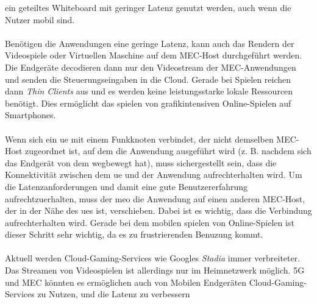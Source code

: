 \documentclass[runningheads]{llncs}
\numberwithin{figure}{section}
\begin{document}
ein geteiltes Whiteboard mit geringer Latenz genutzt werden, auch wenn die Nutzer mobil sind.
\\
\\
Benötigen die Anwendungen eine geringe Latenz, kann auch das Rendern der Videospiele oder Virtuellen Maschine auf dem MEC-Host 
durchgeführt werden. Die Endgeräte decodieren dann nur den Videostream der MEC-Anwendungen und senden die Steuerungseingaben in die Cloud.
Gerade bei Spielen reichen dann \textit{Thin Clients} aus und es werden keine leistungsstarke lokale Ressourcen benötigt. 
Dies ermöglicht das spielen von grafikintensiven Online-Spielen auf Smartphones.
\\
\\
Wenn sich ein \acrshort{ue} mit einem Funkknoten verbindet, der nicht demselben MEC-Host zugeordnet ist, 
auf dem die Anwendung ausgeführt wird (z. B. nachdem sich das Endgerät von dem wegbewegt hat), 
muss sichergestellt sein, dass die Konnektivität zwischen dem \acrshort{ue} und der Anwendung aufrechterhalten wird. 
Um die Latenzanforderungen und damit eine gute Benutzererfahrung aufrechtzuerhalten, 
muss der \acrshort{meo} die Anwendung auf einen anderen MEC-Host, der in der Nähe des \acrshort{ue}s ist, verschieben. 
Dabei ist es wichtig, dass die Verbindung aufrechterhalten wird. Gerade bei dem mobilen spielen von Online-Spielen
ist dieser Schritt sehr wichtig, da es zu frustrierenden Benuzung kommt.
\\
\\
Aktuell werden Cloud-Gaming-Services wie Googles \textit{Stadia} immer verbreiteter. Das Streamen von Videospielen ist
allerdings nur im Heimnetzwerk möglich. 5G und MEC könnten es ermöglichen auch von Mobilen Endgeräten Cloud-Gaming-Services zu Nutzen,
und die Latenz zu verbessern
\end{document}

